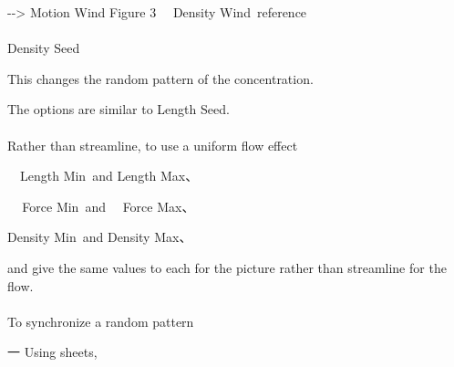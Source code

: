 \documentclass[a4paper,12pt]{article}
\begin{document}
-{-}> \textquotedbl Motion Wind Figure 3 \ \ Density Wind\textquotedbl \ reference\\
\\
Density Seed\par
This changes the random pattern of the concentration.\par
The options are similar to \textquotedbl Length Seed\textquotedbl .\\
\\
Rather than streamline, to use a uniform flow effect\par
\ \ \textquotedbl Length Min\textquotedbl \ and \textquotedbl Length Max\textquotedbl 、\par
\ \,\, \textquotedbl Force Min\textquotedbl \ and \ \, \textquotedbl Force Max\textquotedbl 、\par
\textquotedbl Density Min\textquotedbl \ and \textquotedbl Density Max\textquotedbl 、\par
and give the same values to each for the picture rather than streamline for the flow.\\
\\
To synchronize a random pattern\par
一 Using sheets,

\newpage

\thispagestyle{empty}
\end{document}

